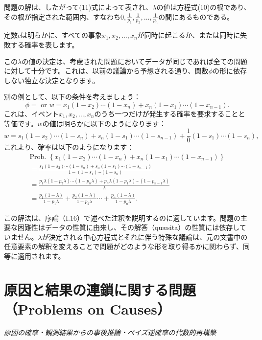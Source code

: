 \documentclass[a4paper,11pt,openany]{ltjsbook}
\begin{document}
問題の解は、したがって(11)式によって表され、$\lambda$の値は方程式(10)の根であり、その根が指定された範囲内、すなわち$0, \frac{1}{p_1}, \frac{1}{p_2}, \dotsc, \frac{1}{p_n}$の間にあるものである。

定数$c$は明らかに、すべての事象$x_1, x_2, \dotsc, x_n$が同時に起こるか、または同時に失敗する確率を表します。

この$\lambda$の値の決定は、考慮された問題においてデータが同じであれば全ての問題に対して十分です。これは、以前の議論から予想される通り、関数$\phi$の形に依存しない独立な決定となります。

別の例として、以下の条件を考えましょう：
\[
  \phi = \text{ or }
  w = x_1(1-x_2) \cdots (1-x_n) + x_n(1-x_1) \cdots (1-x_{n-1}).
\]
これは、イベント$x_1, x_2, \ldots, x_n$のうち一つだけが発生する確率を要求することと等価です。$w$の値は明らかに以下のようになります：
\[
  w = s_1(1-s_2) \cdots (1-s_n) + s_n(1-s_1) \cdots (1-s_{n-1}) + \frac{1}{0}(1-s_1) \cdots (1-s_n),
\]
これより、確率は以下のようになります：
\begin{gather*}
  \text{Prob. }
    \left\{ x_1(1-x_2) \cdots (1-x_n) + x_n(1-x_1) \cdots (1-x_{n-1}) \right\} \\
  = \frac{s_1(1-s_2) \cdots (1-s_n) + s_n(1-s_1) \cdots (1-s_{n-1})}
         {1 - (1-s_1) \cdots (1-s_n)} \\
  = \frac{p_1\lambda(1-p_2\lambda) \cdots (1-p_n\lambda) + p_n\lambda(1-p_1\lambda) \cdots (1-p_{n-1}\lambda)}
         {\lambda} \\
  = \frac{p_1(1-\lambda)}{1-p_1\lambda}
  + \frac{p_2(1-\lambda)}{1-p_2\lambda} \cdots
  + \frac{p_n(1-\lambda)}{1-p_n\lambda}.
\end{gather*}

この解法は、序論（I.16）で述べた注釈を説明するのに適しています。問題の主要な困難性はデータの性質に由来し、その解答（qu{\ae}sita）の性質には依存していません。$\lambda$が決定される中心方程式とそれに伴う特殊な議論は、元の文書中の任意要素の解釈を変えることで問題がどのような形を取り得るかに関わらず、同等に適用されます。

\newpage

\chapter{原因と結果の連鎖に関する問題（Problems on Causes）}
\label{ch:xx}

\begin{center}
\large\textit{原因の確率・観測結果からの事後推論・ベイズ逆確率の代数的再構築}
\end{center}
\vspace{4mm}
\end{document}
